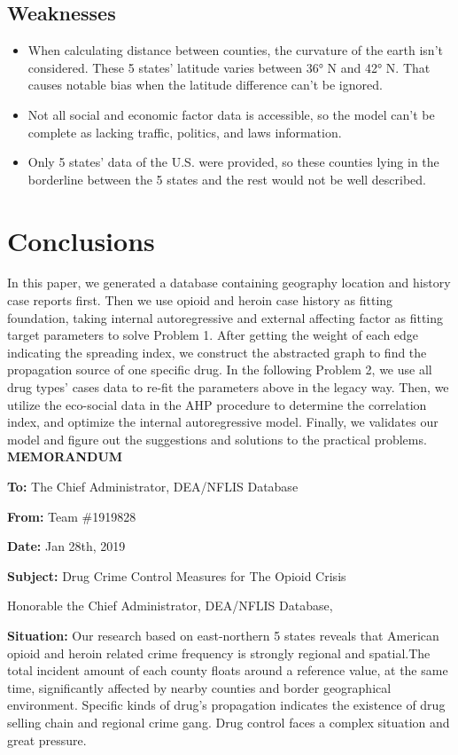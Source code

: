 \documentclass{mcmthesis}
\begin{document}
\subsection{Weaknesses}
\begin{itemize}
	\item When calculating distance between counties, the curvature of the earth isn’t considered. These 5 states’ latitude varies between 36° N and 42° N. That causes notable bias when the latitude difference can’t be ignored.
	\item Not all social and economic factor data is accessible, so the model can’t be complete as lacking traffic, politics, and laws information.
	\item Only 5 states’ data of the U.S. were provided, so these counties lying in the borderline between the 5 states and the rest would not be well described.
\end{itemize}

\section{Conclusions}
In this paper, we generated a database containing geography location and history case reports first. Then we use opioid and heroin case history as fitting foundation, taking internal autoregressive and external affecting factor as fitting target parameters to solve Problem 1. After getting the weight of each edge indicating the spreading index, we construct the abstracted graph to find the propagation source of one specific drug. In the following Problem 2, we use all drug types’ cases data to re-fit the parameters above in the legacy way. Then, we utilize the eco-social data in the AHP procedure to determine the correlation index, and optimize the internal autoregressive model. Finally, we validates our model and figure out the suggestions and solutions to the practical problems.
\newpage
\Large\textbf{MEMORANDUM}

\normalsize \textbf{To:} The Chief Administrator, DEA/NFLIS Database

\textbf{From:} Team \#1919828

\textbf{Date:} Jan 28th, 2019

\textbf{Subject:} Drug Crime Control Measures for The Opioid Crisis

Honorable the Chief Administrator, DEA/NFLIS Database,

\textbf{Situation:} Our research based on east-northern 5 states reveals that American opioid and heroin related crime frequency is strongly regional and spatial.The total incident amount of each county floats around a reference value, at the same time, significantly affected by nearby counties and border geographical environment. Specific kinds of drug's propagation indicates the existence of drug selling chain and regional crime gang. Drug control faces a complex situation and great pressure.
\end{document}
